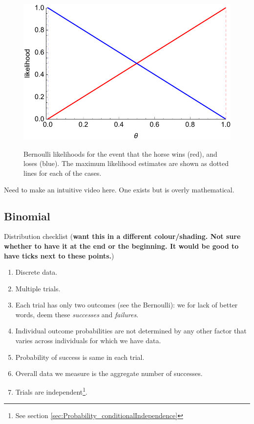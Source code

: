 \documentclass[11pt,fullpage]{book}
\begin{document}
\begin{figure}
\centering
\scalebox{0.5} 
{\includegraphics{Distributions_bernoulliHorseRace.pdf}}
\caption{Bernoulli likelihoods for the event that the horse wins (red), and loses (blue). The maximum likelihood estimates are shown as dotted lines for each of the cases.}\label{fig:Distributions_bernoulliHorseRace}
\end{figure}

 Need to make an intuitive video here. One exists but is overly mathematical.

\subsection{Binomial}\label{sec:Distributions_binomial}
Distribution checklist (\textbf{want this in a different colour/shading. Not sure whether to have it at the end or the beginning. It would be good to have ticks next to these points.})

\begin{enumerate} 
\item Discrete data.
\item Multiple trials.
\item Each trial has only two outcomes (see the Bernoulli): we for lack of better words, deem these \textit{successes} and \textit{failures}.
\item Individual outcome probabilities are not determined by any other factor that varies across individuals for which we have data.
\item Probability of success is same in each trial.
\item Overall data we measure is the aggregate number of successes. 
\item Trials are independent\footnote{See section \ref{sec:Probability_conditionalIndependence}}.
\end{enumerate}
\end{document}
